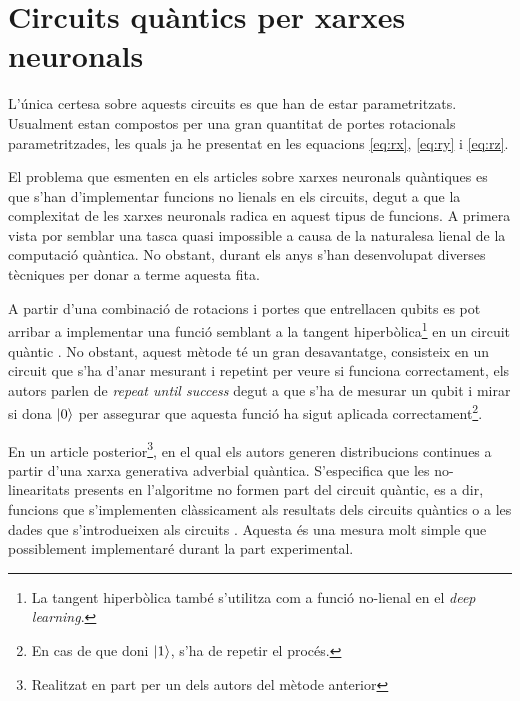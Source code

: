 \section{Circuits quàntics per xarxes neuronals}
L'única  certesa sobre aquests circuits es que han de estar parametritzats. Usualment estan compostos per una gran quantitat de portes rotacionals parametritzades, les quals ja he presentat en les equacions \ref{eq:rx}, \ref{eq:ry} i \ref{eq:rz}. 

El problema que esmenten en els articles sobre xarxes neuronals quàntiques es que s'han d'implementar funcions no lienals en els circuits, degut a que la complexitat de les xarxes neuronals radica en aquest tipus de funcions. A primera vista por semblar una tasca quasi impossible a causa de la naturalesa lienal de la computació quàntica. No obstant, durant els anys s'han desenvolupat diverses tècniques per donar a terme aquesta fita. 

A partir d'una combinació de rotacions i portes que entrellacen qubits es pot arribar a implementar una funció semblant a la tangent hiperbòlica\footnote{La tangent hiperbòlica també s'utilitza com a funció no-lienal en el \textit{deep learning}.} en un circuit quàntic \cite{cao2017quantum}. No obstant, aquest mètode té un gran desavantatge, consisteix en un circuit que s'ha d'anar mesurant i repetint per veure si funciona correctament, els autors parlen de \textit{repeat until success} degut a que s'ha de mesurar un qubit i mirar si dona $\ket{0}$ per assegurar que aquesta funció ha sigut aplicada correctament\footnote{En cas de que doni $\ket{1}$, s'ha de repetir el procés.}. 

En un article posterior\footnote{Realitzat en part per un dels autors del mètode anterior}, en el qual els autors generen distribucions continues a partir d'una xarxa generativa adverbial quàntica.
S'especifica que les no-linearitats presents en l'algoritme no formen part del circuit quàntic, es a dir, funcions que s'implementen clàssicament als resultats dels circuits quàntics o a les dades que s'introdueixen als circuits \cite{romero2019variational}. Aquesta és una mesura molt simple que possiblement implementaré durant la part experimental. 

